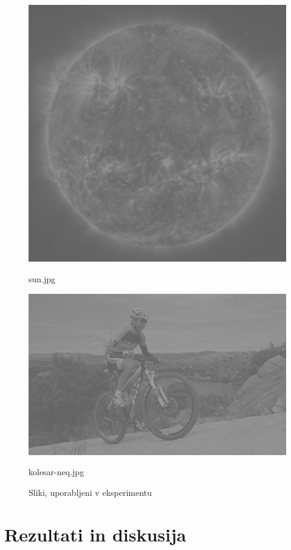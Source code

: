 \documentclass{article}
\begin{document}
\begin{figure}[!h]
    \begin{minipage}{0.48\textwidth}
        \centering
        \includegraphics[width=.9\linewidth]{images/sun.jpg}
        \caption{sun.jpg}
    \end{minipage}\hfill
    \begin{minipage}{0.48\textwidth}
        \centering
        \includegraphics[width=.9\linewidth]{images/kolesar-neq.jpg}
        \caption{kolesar-neq.jpg}
    \end{minipage}
    \caption{Sliki, uporabljeni v eksperimentu}
\end{figure}
\clearpage
\section{Rezultati in diskusija}
\end{document}
